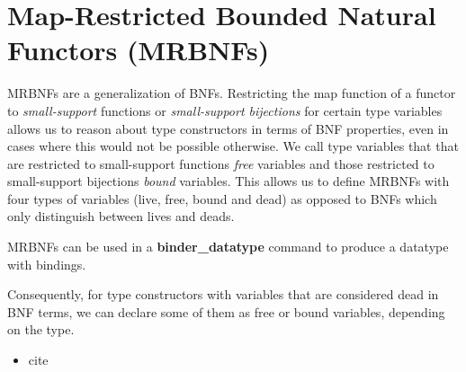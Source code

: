   \section{Map-Restricted Bounded Natural Functors (MRBNFs)}
    \acp{MRBNF} are a generalization of \acp{BNF}. Restricting the \textsf{map} function of a functor to \textit{small-support} functions or \textit{small-support bijections} for certain type variables allows us to reason about type constructors in terms of \ac{BNF} properties, even in cases where this would not be possible otherwise. We call type variables that that are restricted to small-support functions \textit{free} variables  and those restricted to small-support bijections \textit{bound} variables. This allows us to define \acp{MRBNF} with four types of variables (live, free, bound and dead) as opposed to \acp{BNF} which only distinguish between lives and deads. 

    \acp{MRBNF} can be used in a \textbf{binder\_datatype} command to produce a datatype with bindings. 
    
    Consequently, for type constructors with variables that are considered dead in \ac{BNF} terms, we can declare some of them as free or bound variables, depending on the type.

    
  \begin{itemize}
    \item cite \cite{blanchette2019bindings}
  \end{itemize}


